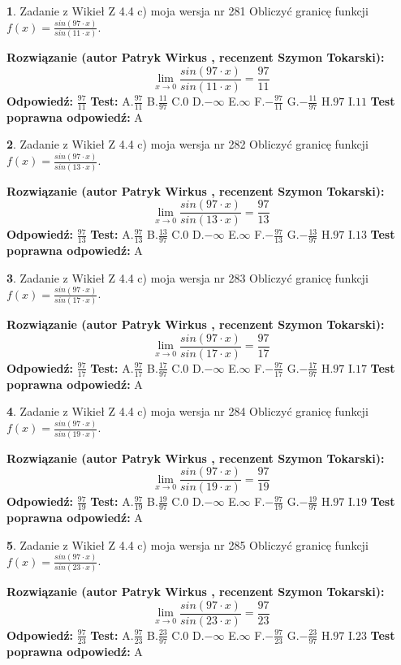 \documentclass[12pt, a4paper]{article}
\theoremstyle{definition} %
\newtheorem{zad}{}
\newcommand{\zadStart}[1]{\begin{zad}#1\newline}
\newcommand{\zadStop}{\end{zad}}
\newcommand{\rozwStart}[2]{\noindent \textbf{Rozwiązanie (autor #1 , recenzent #2): }\newline}
\newcommand{\rozwStop}{\newline}
\newcommand{\odpStart}{\noindent \textbf{Odpowiedź:}\newline}
\newcommand{\odpStop}{\newline}
\newcommand{\testStart}{\noindent \textbf{Test:}\newline}
\newcommand{\testStop}{\newline}
\newcommand{\kluczStart}{\noindent \textbf{Test poprawna odpowiedź:}\newline}
\newcommand{\kluczStop}{\newline}
\begin{document}
\zadStart{Zadanie z Wikieł Z 4.4 c) moja wersja nr 281}
Obliczyć granicę funkcji $f(x)=\frac{sin(97\cdot x)}{sin(11\cdot x)}$.
\zadStop
\rozwStart{Patryk Wirkus}{Szymon Tokarski}
$$\lim\limits_{x\to 0}\frac{sin(97\cdot x)}{sin(11\cdot x)}=
\frac{97}{11}$$
\rozwStop
\odpStart
$\frac{97}{11}$
\odpStop
\testStart
A.$\frac{97}{11}$
B.$\frac{11}{97}$
C.$0$
D.$-\infty$
E.$\infty$
F.$-\frac{97}{11}$
G.$-\frac{11}{97}$
H.$97$
I.$11$
\testStop
\kluczStart
A
\kluczStop



\zadStart{Zadanie z Wikieł Z 4.4 c) moja wersja nr 282}
Obliczyć granicę funkcji $f(x)=\frac{sin(97\cdot x)}{sin(13\cdot x)}$.
\zadStop
\rozwStart{Patryk Wirkus}{Szymon Tokarski}
$$\lim\limits_{x\to 0}\frac{sin(97\cdot x)}{sin(13\cdot x)}=
\frac{97}{13}$$
\rozwStop
\odpStart
$\frac{97}{13}$
\odpStop
\testStart
A.$\frac{97}{13}$
B.$\frac{13}{97}$
C.$0$
D.$-\infty$
E.$\infty$
F.$-\frac{97}{13}$
G.$-\frac{13}{97}$
H.$97$
I.$13$
\testStop
\kluczStart
A
\kluczStop



\zadStart{Zadanie z Wikieł Z 4.4 c) moja wersja nr 283}
Obliczyć granicę funkcji $f(x)=\frac{sin(97\cdot x)}{sin(17\cdot x)}$.
\zadStop
\rozwStart{Patryk Wirkus}{Szymon Tokarski}
$$\lim\limits_{x\to 0}\frac{sin(97\cdot x)}{sin(17\cdot x)}=
\frac{97}{17}$$
\rozwStop
\odpStart
$\frac{97}{17}$
\odpStop
\testStart
A.$\frac{97}{17}$
B.$\frac{17}{97}$
C.$0$
D.$-\infty$
E.$\infty$
F.$-\frac{97}{17}$
G.$-\frac{17}{97}$
H.$97$
I.$17$
\testStop
\kluczStart
A
\kluczStop



\zadStart{Zadanie z Wikieł Z 4.4 c) moja wersja nr 284}
Obliczyć granicę funkcji $f(x)=\frac{sin(97\cdot x)}{sin(19\cdot x)}$.
\zadStop
\rozwStart{Patryk Wirkus}{Szymon Tokarski}
$$\lim\limits_{x\to 0}\frac{sin(97\cdot x)}{sin(19\cdot x)}=
\frac{97}{19}$$
\rozwStop
\odpStart
$\frac{97}{19}$
\odpStop
\testStart
A.$\frac{97}{19}$
B.$\frac{19}{97}$
C.$0$
D.$-\infty$
E.$\infty$
F.$-\frac{97}{19}$
G.$-\frac{19}{97}$
H.$97$
I.$19$
\testStop
\kluczStart
A
\kluczStop



\zadStart{Zadanie z Wikieł Z 4.4 c) moja wersja nr 285}
Obliczyć granicę funkcji $f(x)=\frac{sin(97\cdot x)}{sin(23\cdot x)}$.
\zadStop
\rozwStart{Patryk Wirkus}{Szymon Tokarski}
$$\lim\limits_{x\to 0}\frac{sin(97\cdot x)}{sin(23\cdot x)}=
\frac{97}{23}$$
\rozwStop
\odpStart
$\frac{97}{23}$
\odpStop
\testStart
A.$\frac{97}{23}$
B.$\frac{23}{97}$
C.$0$
D.$-\infty$
E.$\infty$
F.$-\frac{97}{23}$
G.$-\frac{23}{97}$
H.$97$
I.$23$
\testStop
\kluczStart
A
\kluczStop
\end{document}

